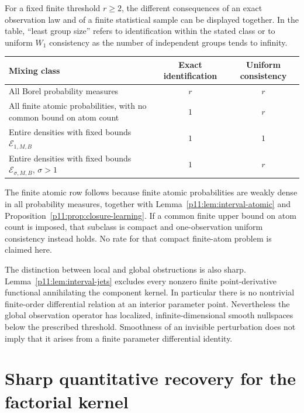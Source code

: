\documentclass[11pt,letterpaper]{article}
\theoremstyle{definition}
\theoremstyle{remark}
\newcommand{\1}{\mathbf 1}
\begin{document}
For a fixed finite threshold $r\geq2$, the different consequences
of an exact observation law and of a finite statistical sample can
be displayed together. In the table, ``least group size'' refers
to identification within the stated class or to uniform $W_1$
consistency as the number of independent groups tends to infinity.
\begin{center}
\small
\begin{tabularx}{\textwidth}{@{}Xcc@{}}
\toprule
Mixing class & Exact identification & Uniform consistency\\
\midrule
All Borel probability measures & $r$ & $r$\\
All finite atomic probabilities, with no common bound on atom count
 & $1$ & $r$\\
Entire densities with fixed bounds $\mathcal E_{1,M,B}$
 & $1$ & $1$\\
Entire densities with fixed bounds $\mathcal E_{\sigma,M,B}$,
 $\sigma>1$ & $1$ & $r$\\
\bottomrule
\end{tabularx}
\end{center}
The finite atomic row follows because finite atomic probabilities
are weakly dense in all probability measures, together with
Lemma~\ref{p11:lem:interval-atomic} and
Proposition~\ref{p11:prop:closure-learning}. If a common finite upper
bound on atom count is imposed, that subclass is compact and
one-observation uniform consistency instead holds. No rate for
that compact finite-atom problem is claimed here.

The distinction between local and global obstructions is also sharp.
Lemma~\ref{p11:lem:interval-jets} excludes every nonzero finite point-derivative
functional annihilating the component kernel. In particular there is
no nontrivial finite-order differential relation at an interior
parameter point. Nevertheless the global observation operator has
localized, infinite-dimensional smooth nullspaces below the prescribed
threshold. Smoothness of an invisible perturbation does not imply
that it arises from a finite parameter differential identity.


\section{Sharp quantitative recovery for the factorial kernel}
\label{p10:sec:quantitative-factorial}
\end{document}
